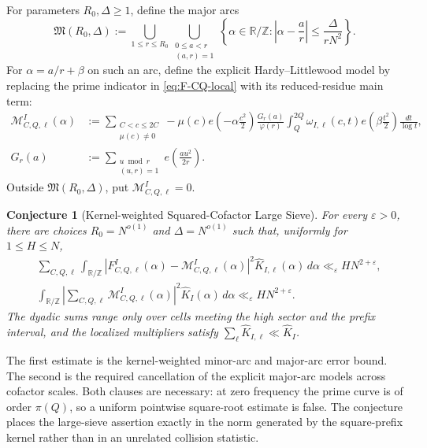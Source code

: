 \documentclass[11pt]{article}
\newtheorem{conjecture}[theorem]{Conjecture}
\theoremstyle{definition}
\theoremstyle{remark}
\newcommand{\eps}{\varepsilon}
\newcommand{\1}{\mathbf{1}}
\begin{document}
For parameters $R_0,\Delta\ge1$, define the major arcs
\begin{equation}
 \mathfrak M(R_0,\Delta)
 :=
 \bigcup_{1\le r\le R_0}
 \bigcup_{\substack{0\le a<r\\(a,r)=1}}
 \left\{
 \alpha\in\mathbb R/\mathbb Z:
 \left|\alpha-\frac ar\right|
 \le\frac{\Delta}{rN^2}
 \right\}.
 \label{eq:major-arcs}
\end{equation}
For $\alpha=a/r+\beta$ on such an arc, define the explicit
Hardy--Littlewood model by replacing the prime indicator in
\cref{eq:F-CQ-local} with its reduced-residue main term:
\begin{align}
 \mathcal M_{C,Q,\ell}^{I}(\alpha)
 &:={}
 \sum_{\substack{C<c\le2C\\\mu(c)\ne0}}
 -\mu(c)e\!\left(-\alpha\frac{c^2}{2}\right)
 \frac{G_r(a)}{\varphi(r)}
 \int_Q^{2Q}
 \omega_{I,\ell}(c,t)
 e\!\left(\beta\frac{t^2}{2}\right)
 \frac{dt}{\log t},
 \label{eq:major-arc-model}\\
 G_r(a)
 &:={}
 \sum_{\substack{u\bmod r\\(u,r)=1}}
 e\!\left(\frac{au^2}{2r}\right).
 \label{eq:quadratic-Gauss-prime}
\end{align}
Outside $\mathfrak M(R_0,\Delta)$, put
$\mathcal M_{C,Q,\ell}^{I}=0$.

\begin{conjecture}[Kernel-weighted Squared-Cofactor Large Sieve]
\label{conj:squared-cofactor-large-sieve}
For every $\eps>0$, there are choices
$R_0=N^{o(1)}$ and $\Delta=N^{o(1)}$ such that, uniformly for
$1\le H\le N$,
\begin{align}
 &\sum_{C,Q,\ell}
 \int_{\mathbb R/\mathbb Z}
 \left|
 F_{C,Q,\ell}^{I}(\alpha)
 -\mathcal M_{C,Q,\ell}^{I}(\alpha)
 \right|^2
 \widehat K_{I,\ell}(\alpha)\,d\alpha
 \ll_\eps HN^{2+\eps},
 \label{eq:cofactor-large-sieve-remainder}\\
 &\int_{\mathbb R/\mathbb Z}
 \left|
 \sum_{C,Q,\ell}
 \mathcal M_{C,Q,\ell}^{I}(\alpha)
 \right|^2
 \widehat K_I(\alpha)\,d\alpha
 \ll_\eps HN^{2+\eps}.
 \label{eq:cofactor-large-sieve-major}
\end{align}
The dyadic sums range only over cells meeting the high sector and the
prefix interval, and the localized multipliers satisfy
$\sum_\ell\widehat K_{I,\ell}\ll\widehat K_I$.
\end{conjecture}

The first estimate is the kernel-weighted minor-arc and major-arc error
bound.  The second is the required cancellation of the explicit
major-arc models across cofactor scales.  Both clauses are necessary:
at zero frequency the prime curve is of order $\pi(Q)$, so a uniform
pointwise square-root estimate is false.  The conjecture places the
large-sieve assertion exactly in the norm generated by the
square-prefix kernel rather than in an unrelated collision statistic.
\end{document}
